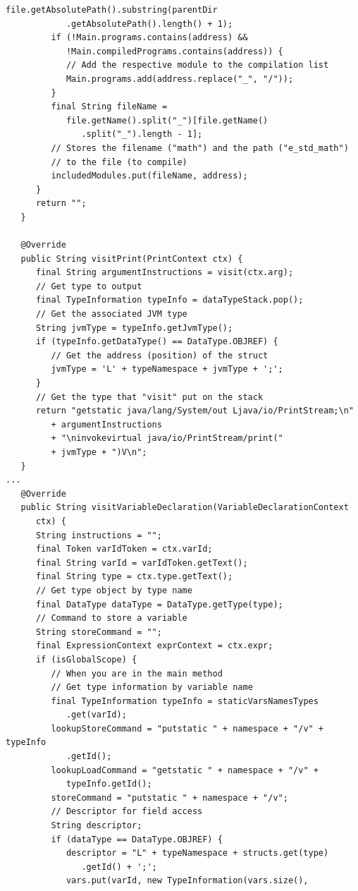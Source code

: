 \begin{lstlisting}[frame=htrbl, caption={Implementation of {\ttfamily EVisitor.java}}, label={lst:visitor}, basicstyle=\footnotesize]
         file.getAbsolutePath().substring(parentDir
            .getAbsolutePath().length() + 1);
         if (!Main.programs.contains(address) &&
            !Main.compiledPrograms.contains(address)) {
            // Add the respective module to the compilation list
            Main.programs.add(address.replace("_", "/"));
         }
         final String fileName =
            file.getName().split("_")[file.getName()
               .split("_").length - 1];
         // Stores the filename ("math") and the path ("e_std_math") 
         // to the file (to compile)
         includedModules.put(fileName, address);
      }
      return "";
   }

   @Override
   public String visitPrint(PrintContext ctx) {
      final String argumentInstructions = visit(ctx.arg);
      // Get type to output
      final TypeInformation typeInfo = dataTypeStack.pop();
      // Get the associated JVM type
      String jvmType = typeInfo.getJvmType();
      if (typeInfo.getDataType() == DataType.OBJREF) {
         // Get the address (position) of the struct
         jvmType = 'L' + typeNamespace + jvmType + ';';
      }
      // Get the type that "visit" put on the stack
      return "getstatic java/lang/System/out Ljava/io/PrintStream;\n"
         + argumentInstructions
         + "\ninvokevirtual java/io/PrintStream/print("
         + jvmType + ")V\n";
   }
...
   @Override
   public String visitVariableDeclaration(VariableDeclarationContext 
      ctx) {
      String instructions = "";
      final Token varIdToken = ctx.varId;
      final String varId = varIdToken.getText();
      final String type = ctx.type.getText();
      // Get type object by type name
      final DataType dataType = DataType.getType(type);
      // Command to store a variable
      String storeCommand = "";
      final ExpressionContext exprContext = ctx.expr;
      if (isGlobalScope) {
         // When you are in the main method
         // Get type information by variable name
         final TypeInformation typeInfo = staticVarsNamesTypes
            .get(varId);
         lookupStoreCommand = "putstatic " + namespace + "/v" + typeInfo
            .getId();
         lookupLoadCommand = "getstatic " + namespace + "/v" + 
            typeInfo.getId();
         storeCommand = "putstatic " + namespace + "/v";
         // Descriptor for field access
         String descriptor;
         if (dataType == DataType.OBJREF) {
            descriptor = "L" + typeNamespace + structs.get(type)
               .getId() + ';';
            vars.put(varId, new TypeInformation(vars.size(), 

\end{lstlisting}
